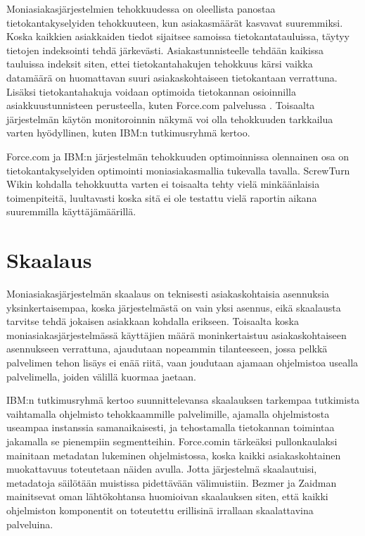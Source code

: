 Moniasiakasjärjestelmien tehokkuudessa on oleellista panostaa tietokantakyselyiden tehokkuuteen, kun asiakasmäärät kasvavat suuremmiksi. Koska kaikkien asiakkaiden tiedot sijaitsee samoissa tietokantatauluissa, täytyy tietojen indeksointi tehdä järkevästi. Asiakastunnisteelle tehdään kaikissa tauluissa indeksit siten, ettei tietokantahakujen tehokkuus kärsi vaikka datamäärä on huomattavan suuri asiakaskohtaiseen tietokantaan verrattuna. Lisäksi tietokantahakuja voidaan optimoida tietokannan osioinnilla asiakkuustunnisteen perusteella, kuten Force.com palvelussa \cite{weissman2009design}. Toisaalta järjestelmän käytön monitoroinnin näkymä voi olla tehokkuuden tarkkailua varten hyödyllinen, kuten IBM:n tutkimusryhmä \cite{kwok2008software} kertoo.

Force.com ja IBM:n järjestelmän tehokkuuden optimoinnissa olennainen osa on tietokantakyselyiden optimointi moniasiakasmallia tukevalla tavalla. ScrewTurn Wikin kohdalla tehokkuutta varten ei toisaalta tehty vielä minkäänlaisia toimenpiteitä, luultavasti koska sitä ei ole testattu vielä raportin aikana suuremmilla käyttäjämäärillä.

\section{Skaalaus}
Moniasiakasjärjestelmän skaalaus on teknisesti asiakaskohtaisia asennuksia yksinkertaisempaa, koska järjestelmästä on vain yksi asennus, eikä skaalausta tarvitse tehdä jokaisen asiakkaan kohdalla erikseen. Toisaalta koska moniasiakasjärjestelmässä käyttäjien määrä moninkertaistuu asiakaskohtaiseen asennukseen verrattuna, ajaudutaan nopeammin tilanteeseen, jossa pelkkä palvelimen tehon lisäys ei enää riitä, vaan joudutaan ajamaan ohjelmistoa usealla palvelimella, joiden välillä kuormaa jaetaan.

IBM:n tutkimusryhmä \cite{kwok2008software} kertoo suunnittelevansa skaalauksen tarkempaa tutkimista vaihtamalla ohjelmisto tehokkaammille palvelimille, ajamalla ohjelmistosta useampaa instanssia samanaikaisesti, ja tehostamalla tietokannan toimintaa jakamalla se pienempiin segmentteihin. Force.comin tärkeäksi pullonkaulaksi mainitaan \cite{weissman2009design} metadatan lukeminen ohjelmistossa, koska kaikki asiakaskohtainen muokattavuus toteutetaan näiden avulla. Jotta järjestelmä skaalautuisi, metadatoja säilötään muistissa pidettävään välimuistiin. Bezmer ja Zaidman \cite{bezemer2010challenges} mainitsevat oman lähtökohtansa huomioivan skaalauksen siten, että kaikki ohjelmiston komponentit on toteutettu erillisinä irrallaan skaalattavina palveluina.

